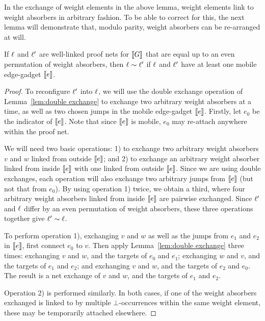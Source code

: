 \documentclass{lmcs}
\begin{document}
In the exchange of weight elements in the above lemma, weight elements link to weight absorbers in arbitrary fashion.
%
To be able to correct for this, the next lemma will demonstrate that, modulo parity, weight absorbers can be re-arranged at will.




\begin{lemma}
\label{lem:permute weight absorbers}
If $\ell$ and $\ell'$ are well-linked proof nets for $\llbracket G\rrbracket$ that are equal up to an even permutation of weight absorbers, then $\links\perm\links'$ if $\ell$ and $\ell'$ have at least one mobile edge-gadget $\llbracket e\rrbracket$.
\end{lemma}

\begin{proof}
To reconfigure $\ell'$ into $\ell$, we will use the double exchange operation of Lemma~\ref{lem:double exchange} to exchange two arbitrary weight absorbers at a time, as well as two chosen jumps in the mobile edge-gadget $\llbracket e\rrbracket$.
%
Firstly, let $e_0$ be the indicator of $\llbracket e\rrbracket$.
%
Note that since $\llbracket e\rrbracket$ is mobile, $e_0$ may re-attach anywhere within the proof net.


We will need two basic operations: 1) to exchange two arbitrary weight absorbers $v$ and $w$ linked from outside $\llbracket e\rrbracket$; and 2) to exchange an arbitrary weight absorber linked from inside $\llbracket e\rrbracket$ with one linked from outside $\llbracket e\rrbracket$.
%
Since we are using double exchanges, each operation will also exchange two arbitrary jumps from $\llbracket e\rrbracket$ (but not that from $e_0$).
%
By using operation 1) twice, we obtain a third, where four arbitrary weight absorbers linked from inside $\llbracket e\rrbracket$ are pairwise exchanged.
%
Since $\ell'$ and $\ell$ differ by an even permutation of weight absorbers, these three operations together give $\ell'\sim\ell$.


To perform operation 1), exchanging $v$ and $w$ as well as the jumps from $e_1$ and $e_2$ in $\llbracket e\rrbracket$, first connect $e_0$ to $v$.
%
Then apply Lemma~\ref{lem:double exchange} three times: exchanging $v$ and $w$, and the targets of $e_0$ and $e_1$; exchanging $w$ and $v$, and the targets of $e_1$ and $e_2$; and exchanging $v$ and $w$, and the targets of $e_2$ and $e_0$.
%
The result is a net exchange of $v$ and $w$, and the targets of $e_1$ and $e_2$.


Operation 2) is performed similarly.
%
In both cases, if one of the weight absorbers exchanged is linked to by multiple $\bot$-occurrences within the same weight element, these may be temporarily attached elsewhere.
%
\end{proof}
\end{document}
